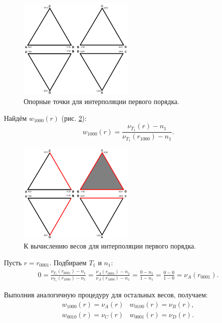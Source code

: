 \begin{figure}[h]
\centering
\includegraphics[width=0.5\textwidth]{png/tetr-interp-1st-order-1.png}
\caption{Опорные точки для интерполяции первого порядка.}
\label{pic:tetr-interpolation-1st-order-1}
\end{figure}

Найдём $w_{1000}(r)$ (рис. \ref{pic:tetr-interpolation-1st-order-2}):
\begin{equation}
w_{1000}(r) = \frac{ \nu_{T_1}(r) - n_1 }{ \nu_{T_1}(r_{1000}) - n_1 }.
\end{equation}

\begin{figure}[h]
\centering
\includegraphics[width=0.5\textwidth]{png/tetr-interp-1st-order-2.png}
\caption{К вычислению весов для интерполяции первого порядка.}
\label{pic:tetr-interpolation-1st-order-2}
\end{figure}

Пусть $r = r_{0001}$. Подбираем $T_1$ и $n_1$:
\begin{eqnarray}
0 = \frac{ \nu_{T_1}(r_{0001}) - n_1 }{ \nu_{T_1}(r_{1000}) - n_1 } = \frac{ \nu_{A}(r_{0001}) - n_1 }{ \nu_{A}(r_{1000}) - n_1 } = \frac{0-n_1}{1-n_1} = \frac{0-0}{1-0} = \nu_{A}(r_{0001}).
\end{eqnarray}

Выполнив аналогичную процедуру для остальных весов, получаем:
\begin{eqnarray}
w_{1000}(r) = \nu_{A}(r) & w_{0100}(r) = \nu_{B}(r), \\
w_{0010}(r) = \nu_{C}(r) & w_{0001}(r) = \nu_{D}(r).
\end{eqnarray}


